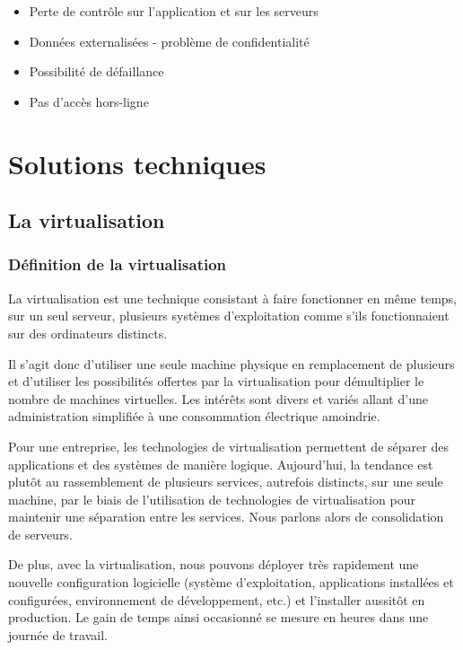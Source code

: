 \documentclass[a4paper,12pt]{report}
\begin{document}
\begin{onehalfspace}
	\begin{itemize}
		\item Perte de contrôle sur l’application et sur les serveurs
		\item Données externalisées - problème de confidentialité
		\item Possibilité de défaillance
		\item Pas d’accès hors-ligne
	\end{itemize}

	\chapter{Solutions techniques}
	
	\section{La virtualisation}
	
	\subsection{Définition de la virtualisation}
	La virtualisation est une technique consistant à faire fonctionner en même temps, sur un seul serveur, plusieurs systèmes d'exploitation comme s'ils fonctionnaient sur des ordinateurs distincts.
	
	 Il s’agit donc d’utiliser une seule machine physique en remplacement de plusieurs et d’utiliser les possibilités offertes par la virtualisation pour démultiplier le nombre de machines virtuelles. Les intérêts sont divers et variés allant d’une administration simplifiée à une consommation électrique amoindrie.
	 
	Pour une entreprise, les technologies de virtualisation permettent de séparer des applications et des systèmes de manière logique. Aujourd'hui, la tendance est plutôt au rassemblement de plusieurs services, autrefois distincts, sur une seule machine, par le biais de l’utilisation de technologies de virtualisation pour maintenir une séparation entre les services. Nous parlons alors de consolidation de serveurs.
	
	De plus, avec la virtualisation, nous pouvons déployer très rapidement une nouvelle configuration logicielle (système d’exploitation, applications installées et configurées, environnement de développement, etc.) et l’installer aussitôt en production. Le gain de temps ainsi occasionné se mesure en heures dans une journée de travail. 
	

\end{onehalfspace}
\end{document}
